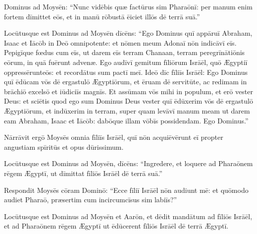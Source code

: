 \thispagestyle{empty}

 Dominus ad Moysēn: ``Nunc vidēbis quæ factūrus
sim Pharaōnī: per manum enim fortem dīmittet eōs, et in
manū rōbustā ēiciet illōs dē
terrā suā.''

Locūtusque est
Dominus ad Moysēn dīcēns: ``Ego Dominus quī appāruī
Abraham, Isaac et Iācōb in Deō omnipotente:
et nōmen meum Adonaī
nōn indicāvī eīs. 
Pepigīque fœdus cum eīs, ut darem eīs terram
Chanaan, terram peregrīnātiōnis eōrum, in
quā fuērunt advenæ.  Ego audīvī gemitum fīliōrum Isrāēl, quō Ægyptiī
oppressērunt\linebreak eōs:
et recordātus sum pactī meī.  Ideō dīc
fīliīs Isrāēl: Ego Dominus quī ēdūcam vōs dē
ergastulō Ægyptiōrum, et ēruam dē servitūte, ac redimam in
brāchiō excelsō et
iūdiciīs
magnīs.  Et assūmam vōs mihi in populum, et erō vester Deus: et sciētis
quod ego sum Dominus Deus vester quī ēdūxerim vōs dē
ergastulō Ægyptiōrum,  et indūxerim in terram, super quam
levāvī manum meam ut darem eam Abraham, Isaac et Iācōb:
dabōque illam vōbīs possidendam. Ego Dominus.''

Nārrāvit ergō
Moysēs omnia fīliīs Isrāēl, quī nōn
acquiēvērunt eī propter angustiam
spīritūs et opus dūrissimum.  

Locūtusque est Dominus ad
Moysēn, dīcēns:  ``Ingredere, et
loquere ad Pharaōnem rēgem Ægyptī, ut dīmittat fīliōs
Isrāēl dē terrā suā.''

Respondit Moysēs
cōram Dominō: ``Ecce fīliī Isrāēl nōn audiunt mē: et
quōmodo audiet Pharaō, præsertim cum incircumcīsus sim labiīs?''

Locūtusque est Dominus ad
Moysēn et Aarōn, et dēdit mandātum ad
fīliōs Isrāēl, et ad Pharaōnem rēgem Ægyptī
ut ēdūcerent fīliōs Isrāēl dē terrā Ægyptī.
